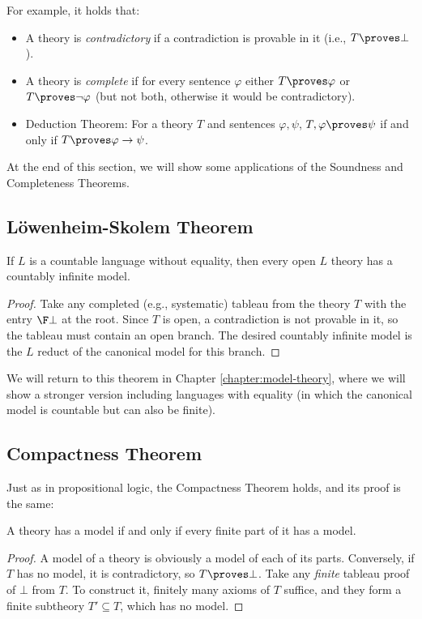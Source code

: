 For example, it holds that:
\begin{itemize}
    \item A theory is \emph{contradictory} if a contradiction is provable in it (i.e., $T\proves\bot$).
    \item A theory is \emph{complete} if for every sentence $\varphi$ either $T\proves\varphi$ or $T\proves\neg\varphi$ (but not both, otherwise it would be contradictory).
    \item Deduction Theorem: For a theory $T$ and sentences $\varphi,\psi$, $T,\varphi\proves\psi$ if and only if $T\proves\varphi\to\psi$.
\end{itemize}

At the end of this section, we will show some applications of the Soundness and Completeness Theorems.

\subsection{Löwenheim-Skolem Theorem}\label{subsection:loewenheim-skolem-theorem}

\begin{theorem}
    If $L$ is a countable language without equality, then every open $L$ theory has a countably infinite model.
\end{theorem}

\begin{proof}
Take any completed (e.g., systematic) tableau from the theory $T$ with the entry $\F\bot$ at the root. Since $T$ is open, a contradiction is not provable in it, so the tableau must contain an open branch. The desired countably infinite model is the $L$ reduct of the canonical model for this branch.
\end{proof}

We will return to this theorem in Chapter \ref{chapter:model-theory}, where we will show a stronger version including languages with equality (in which the canonical model is countable but can also be finite).

\subsection{Compactness Theorem}

Just as in propositional logic, the Compactness Theorem holds, and its proof is the same:

\begin{theorem}[On Compactness]\label{theorem:compactness-theorem-predicate}
    A theory has a model if and only if every finite part of it has a model.    
\end{theorem}
\begin{proof}
A model of a theory is obviously a model of each of its parts. Conversely, if $T$ has no model, it is contradictory, so $T\proves\bot$. Take any \emph{finite} tableau proof of $\bot$ from $T$. To construct it, finitely many axioms of $T$ suffice, and they form a finite subtheory $T'\subseteq T$, which has no model.
\end{proof}


